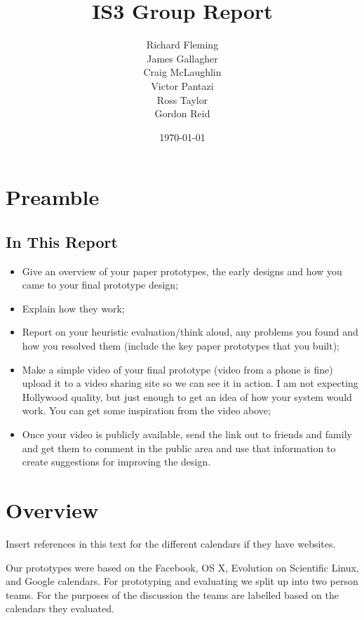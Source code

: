 \documentclass{article}
\title{IS3 Group Report}
\author{
  Richard Fleming \\
  James Gallagher \\
  Craig McLaughlin \\
  Victor Pantazi \\
  Ross Taylor \\
  Gordon Reid}
\date{\today}
\begin{document}

\maketitle


\section{Preamble}

\subsection{In This Report}

\begin{itemize}
\item Give an overview of your paper prototypes, the early designs and
how you came to your final prototype design;

\item Explain how they work;

\item Report on your heuristic evaluation/think aloud, any problems you
found and how you resolved them (include the key paper prototypes that
you built);

\item Make a simple video of your final prototype (video from a phone
is fine) upload it to a video sharing site so we can see it in action.
I am not expecting Hollywood quality, but just enough to get an idea
of how your system would work. You can get some inspiration from the
video above;

\item Once your video is publicly available, send the link out to
friends and family and get them to comment in the public area and use
that information to create suggestions for improving the design.
\end{itemize}

\section{Overview}

Insert references in this text for the different calendars if they
have websites.

Our prototypes were based on the Facebook, OS X, Evolution on Scientific
Linux, and Google calendars. For prototyping and evaluating we split up
into two person teams. For the purposes of the discussion the teams are
labelled based on the calendars they evaluated.
\end{document}

